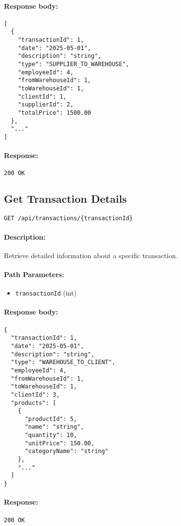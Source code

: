 \documentclass[a4paper,11pt]{article}
\begin{document}
\paragraph{Response body:}
\begin{verbatim}
[
  {
    "transactionId": 1,
    "date": "2025-05-01",
    "description": "string",
    "type": "SUPPLIER_TO_WAREHOUSE",
    "employeeId": 4,
    "fromWarehouseId": 1,
    "toWarehouseId": 1,
    "clientId": 1,
    "supplierId": 2,
    "totalPrice": 1500.00
  },
  "..."
]
\end{verbatim}
\paragraph{Response:} \texttt{200 OK}

\subsection{Get Transaction Details}
\label{sec:transactions-details}
\begin{verbatim}
GET /api/transactions/{transactionId}
\end{verbatim}
\paragraph{Description:} Retrieve detailed information about a specific transaction.
\paragraph{Path Parameters:}
\begin{itemize}
  \item \texttt{transactionId} (int)
\end{itemize}
\paragraph{Response body:}
\begin{verbatim}
{
  "transactionId": 1,
  "date": "2025-05-01",
  "description": "string",
  "type": "WAREHOUSE_TO_CLIENT",
  "employeeId": 4,
  "fromWarehouseId": 1,
  "toWarehouseId": 1,
  "clientId": 3,
  "products": [
    {
      "productId": 5,
      "name": "string",
      "quantity": 10,
      "unitPrice": 150.00,
      "categoryName": "string"
    },
    "..."
  ]
}
\end{verbatim}
\paragraph{Response:} \texttt{200 OK}
\end{document}
